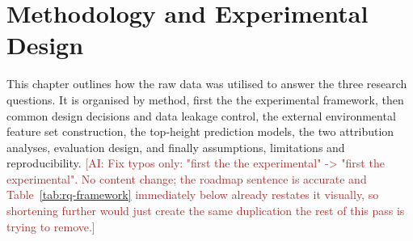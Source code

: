 \newcommand{\fc}[1]{\textcolor{red}{[FactC: #1]}}
\newcommand{\ct}[1]{\textcolor{orange}{[CITE: #1]}}
\newcommand{\app}[1]{\textcolor{blue}{[APP: #1]}}
\newcommand{\sr}[1]{\textcolor{teal}{[Sreword: #1]}}
\newcommand{\fig}[1]{\textcolor{purple}{[FIG: #1]}}
\newcommand{\ai}[1]{\textcolor{brown}{[AI: #1]}}

\chapter{Methodology and Experimental Design}
\label{ch:methodology}

This chapter outlines how the raw data was utilised to answer the three research questions. It is organised by method, first the the experimental framework, then common design decisions and data leakage control, the external environmental feature set construction, the top-height prediction models, the two attribution analyses, evaluation design, and finally assumptions, limitations and reproducibility.
\ai{Fix typos only: "first the the experimental" -> "first the experimental". No content change; the roadmap sentence is accurate and Table~\ref{tab:rq-framework} immediately below already restates it visually, so shortening further would just create the same duplication the rest of this pass is trying to remove.}

